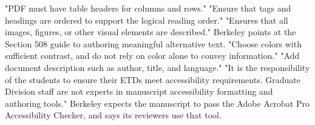 	{"PDF must have table headers for columns and rows."}
	{"Ensure that tags and headings are ordered to support the logical reading
	 order."}
	{"Ensures that all images, figures, or other visual elements are described."
	 Berkeley points at the Section 508 guide to authoring meaningful
	 alternative text.}
	{"Choose colors with sufficient contrast, and do not rely on color alone to
	 convey information."}
	{"Add document description such as author, title, and language."}
	{"It is the responsibility of the students to ensure their ETDs meet
	 accessibility requirements. Graduate Division staff are not experts in
	 manuscript accessibility formatting and authoring tools." Berkeley expects
	 the manuscript to pass the Adobe Acrobat Pro Accessibility Checker, and
	 says its reviewers use that tool.}

